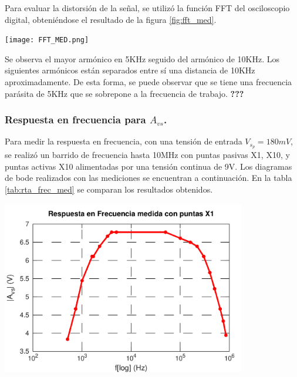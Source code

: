 \documentclass[a4paper, 10pt, spanish]{article}
\begin{document}
Para evaluar la distorsión de la señal, se utilizó la función FFT del osciloscopio digital, obteniéndose el resultado de la figura \ref{fig:fft_med}.

\begin{center}
  \texttt{[image: FFT\_MED.png]}
  \label{fig:fft_med}
\end{center}

Se observa el mayor armónico en 5KHz seguido del armónico de 10KHz. Los siguientes armónicos están separados entre sí una distancia de 10KHz aproximadamente. De esta forma, se puede observar que se tiene una frecuencia parásita de 5KHz que se sobrepone a la frecuencia de trabajo. \textbf{???}

\subsubsection{Respuesta en frecuencia para $A_{vs}$.}
Para medir la respuesta en frecuencia, con una tensión de entrada $V_{s_p}=180mV$, se realizó un barrido de frecuencia hasta 10MHz con puntas pasivas X1, X10, y puntas activas X10 alimentadas por una tensión continua de 9V. Los diagramas de bode realizados con las mediciones se encuentran a continuación. En la tabla \ref{tab:rta_frec_med} se comparan los resultados obtenidos.

\begin{center}
  \includegraphics[width=0.8\textwidth]{X1.png}
  \label{fig:X1_med}
\end{center}
\end{document}
